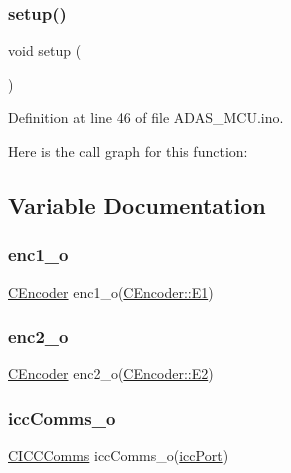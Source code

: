 \subsubsection{\texorpdfstring{setup()}{setup()}}
{\footnotesize\ttfamily void setup (\begin{DoxyParamCaption}{ }\end{DoxyParamCaption})}



Definition at line 46 of file A\+D\+A\+S\+\_\+\+M\+C\+U.\+ino.

Here is the call graph for this function\+:


\subsection{Variable Documentation}
\mbox{\label{_a_d_a_s___m_c_u_8ino_ad90699f8fbb0fa8f734ae5c30885ee3b}} 
\subsubsection{\texorpdfstring{enc1\_o}{enc1\_o}}
{\footnotesize\ttfamily \mbox{\hyperlink{class_c_encoder}{C\+Encoder}} enc1\+\_\+o(\mbox{\hyperlink{class_c_encoder_a49810cc352199fb02a60e2ef8ac6cbc3a8f0ceb6874e0c79b53bf26fa42a1b652}{C\+Encoder\+::\+E1}})}

\mbox{\label{_a_d_a_s___m_c_u_8ino_a54cfc96aae4913b87ab356a0665557a5}} 
\subsubsection{\texorpdfstring{enc2\_o}{enc2\_o}}
{\footnotesize\ttfamily \mbox{\hyperlink{class_c_encoder}{C\+Encoder}} enc2\+\_\+o(\mbox{\hyperlink{class_c_encoder_a49810cc352199fb02a60e2ef8ac6cbc3aaa314a69656e242defabd33eb8e90284}{C\+Encoder\+::\+E2}})}

\mbox{\label{_a_d_a_s___m_c_u_8ino_a62ef6b3308259edb69af585549178324}} 
\subsubsection{\texorpdfstring{iccComms\_o}{iccComms\_o}}
{\footnotesize\ttfamily \mbox{\hyperlink{class_c_i_c_c_comms}{C\+I\+C\+C\+Comms}} icc\+Comms\+\_\+o(\mbox{\hyperlink{_a_d_a_s___m_c_u_8ino_ad1e6d9fed4369104e412a46c019634d2}{icc\+Port}})}

